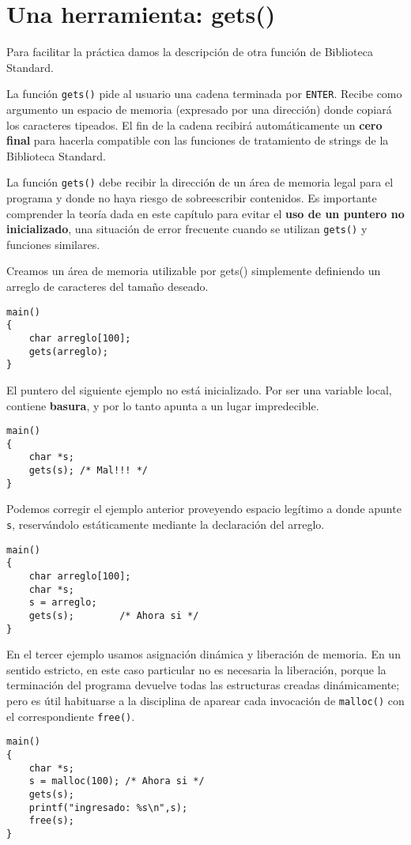 \section{Una herramienta: gets()}
\label{sec:lafunciongets}

Para facilitar la práctica damos la descripción de otra función de Biblioteca
Standard.

La función \lstinline{gets()} pide al usuario una cadena terminada por \lstinline{ENTER}. Recibe como
argumento un espacio de memoria (expresado por una dirección) donde copiará los
caracteres tipeados. El fin de la cadena recibirá automáticamente un \textbf{cero final} para hacerla compatible con
las funciones de tratamiento de strings de la Biblioteca Standard.

La función \lstinline{gets()} debe recibir la dirección de un área
de memoria legal para el programa y donde no haya riesgo de sobreescribir
contenidos. Es importante comprender la teoría dada en este capítulo para
evitar el \textbf{uso de un puntero no inicializado}, una situación de error frecuente 
cuando se utilizan \lstinline{gets()} y funciones similares. 


\begin{ejemplo}

Creamos un área de memoria utilizable por gets() simplemente definiendo un arreglo de caracteres del tamaño deseado. 
\begin{lstlisting}
main()
{
    char arreglo[100];
    gets(arreglo);
}
\end{lstlisting}

El puntero del siguiente ejemplo no está inicializado. Por ser una variable local,
contiene \textbf{basura}, y por lo tanto apunta a un lugar impredecible.
\begin{lstlisting}
main()
{
    char *s;
    gets(s); /* Mal!!! */
}
\end{lstlisting}

Podemos corregir el ejemplo anterior proveyendo espacio legítimo a donde apunte \lstinline{s}, reservándolo
estáticamente mediante la declaración del arreglo.

\begin{lstlisting}
main()
{
    char arreglo[100];
    char *s;
    s = arreglo;
    gets(s); 		/* Ahora si */
}
\end{lstlisting}

En el tercer ejemplo usamos asignación dinámica y liberación de memoria. En un
sentido estricto, en este caso particular no es necesaria la liberación, porque
la terminación del programa devuelve todas las estructuras creadas
dinámicamente; pero es útil habituarse a la disciplina de aparear cada
invocación de \lstinline{malloc()} con el correspondiente \lstinline{free()}.

\begin{lstlisting}
main()
{
    char *s;
    s = malloc(100); /* Ahora si */
    gets(s);
    printf("ingresado: %s\n",s);
    free(s);
}
\end{lstlisting}
\end{ejemplo}

